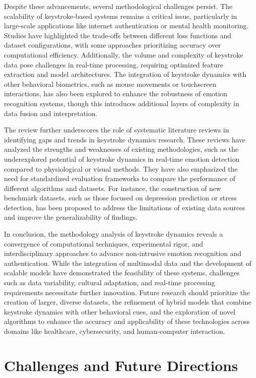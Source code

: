 \documentclass[conference]{IEEEtran}
\begin{document}
Despite these advancements, several methodological challenges persist. The scalability of keystroke-based systems remains a critical issue, particularly in large-scale applications like internet authentication or mental health monitoring. Studies have highlighted the trade-offs between different loss functions and dataset configurations, with some approaches prioritizing accuracy over computational efficiency. Additionally, the volume and complexity of keystroke data pose challenges in real-time processing, requiring optimized feature extraction and model architectures. The integration of keystroke dynamics with other behavioral biometrics, such as mouse movements or touchscreen interactions, has also been explored to enhance the robustness of emotion recognition systems, though this introduces additional layers of complexity in data fusion and interpretation.  

The review further underscores the role of systematic literature reviews in identifying gaps and trends in keystroke dynamics research. These reviews have analyzed the strengths and weaknesses of existing methodologies, such as the underexplored potential of keystroke dynamics in real-time emotion detection compared to physiological or visual methods. They have also emphasized the need for standardized evaluation frameworks to compare the performance of different algorithms and datasets. For instance, the construction of new benchmark datasets, such as those focused on depression prediction or stress detection, has been proposed to address the limitations of existing data sources and improve the generalizability of findings.  

In conclusion, the methodology analysis of keystroke dynamics reveals a convergence of computational techniques, experimental rigor, and interdisciplinary approaches to advance non-intrusive emotion recognition and authentication. While the integration of multimodal data and the development of scalable models have demonstrated the feasibility of these systems, challenges such as data variability, cultural adaptation, and real-time processing requirements necessitate further innovation. Future research should prioritize the creation of larger, diverse datasets, the refinement of hybrid models that combine keystroke dynamics with other behavioral cues, and the exploration of novel algorithms to enhance the accuracy and applicability of these technologies across domains like healthcare, cybersecurity, and human-computer interaction.

\section{Challenges and Future Directions}
\end{document}
